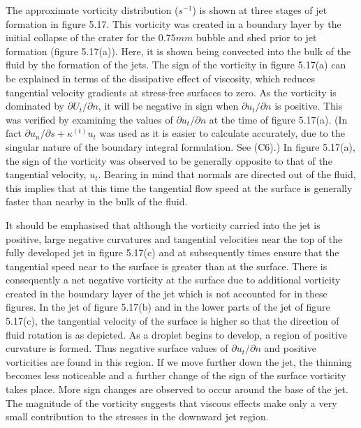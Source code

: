 The approximate vorticity distribution ($s^{-1}$) is shown at three stages of
jet formation in figure 5.17. This vorticity was created 
in a boundary layer by the
initial collapse of the crater for the $0.75mm$ bubble and shed 
prior to jet formation (figure 5.17(a)).
Here, it is shown being convected into the bulk of the fluid by
the formation of the jets.
The sign of the vorticity in figure 5.17(a) can be explained in terms of the dissipative 
effect of viscosity, which reduces tangential velocity gradients at stress-free
surfaces to zero.
As the vorticity is dominated by $\partial U_t/\partial n$, it
will be negative in sign when $\partial u_t/\partial n$
is positive. This was verified by examining the values of
$\partial u_t/\partial n$ at the time of figure 5.17(a).
(In fact $\partial u_n/\partial s+\kappa^{(t)}u_t$
was used as it is easier to calculate accurately, due to the singular nature of
the boundary integral formulation. See (C6).)
In figure 5.17(a), the 
sign of the vorticity was observed to be
generally opposite to that of the tangential velocity, $u_t$.
Bearing in mind that normals are directed
out of the fluid, this implies that at this time
the tangential flow speed at the surface is 
generally faster than nearby in the bulk of the fluid.

It should be emphasised that although the vorticity carried into the jet 
is positive, large negative curvatures and tangential velocities near
the top of the fully developed jet in figure 5.17(c) and at subsequently times
ensure that the tangential speed near to the surface is
greater than at the surface. There is consequently a net 
negative vorticity at the surface due to additional 
vorticity created in the boundary layer 
of the jet which is not accounted for in these figures. 
In the jet of figure 5.17(b) and in the lower parts of the jet of figure 5.17(c),
the tangential velocity of the surface is higher so that the
direction of fluid rotation is as depicted.
As a droplet begins to develop, a region of positive curvature
is formed. Thus negative surface values of $\partial u_t/\partial n$
and positive vorticities are found in this region. 
If we move further down the jet, the thinning becomes less noticeable and 
a further change of the sign of the surface vorticity takes place.
More sign changes are observed to occur around the base of the jet.
The magnitude of the vorticity suggests that
viscous effects make only a very small contribution to
the stresses in the downward jet region.

